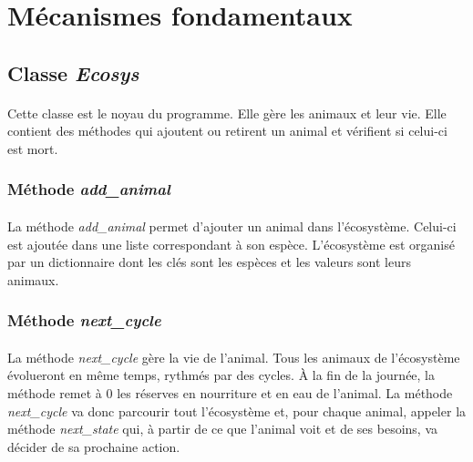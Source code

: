 \documentclass[a4paper,11pt,final,oneside]{article}
\begin{document}
	\section{Mécanismes fondamentaux}
	\label{sec:mec}
	
		\subsection{Classe \textit{Ecosys}}
		
\paragraph{} Cette classe est le noyau du programme. Elle gère les animaux et leur vie. Elle contient des méthodes qui ajoutent ou retirent un animal et vérifient si celui-ci est mort.

			\subsubsection{Méthode \textit{add\_animal}}

\paragraph{} La méthode \textit{add\_animal} permet d'ajouter un animal dans l'écosystème. Celui-ci est ajoutée dans une liste correspondant à son espèce. L'écosystème est organisé par un dictionnaire dont les clés sont les espèces et les valeurs sont leurs animaux.

			\subsubsection{Méthode \textit{next\_cycle}}

\paragraph{} La méthode \textit{next\_cycle} gère la vie de l'animal. Tous les animaux de l'écosystème évolueront en même temps, rythmés par des cycles. À la fin de la journée, la méthode remet à 0 les réserves en nourriture et en eau de l'animal. La méthode \textit{next\_cycle} va donc parcourir tout l'écosystème et, pour chaque animal, appeler la méthode \textit{next\_state} qui, à partir de ce que l'animal voit et de ses besoins, va décider de sa prochaine action.

\end{document}
